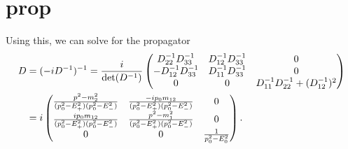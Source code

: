 \documentclass{article}
\begin{document}
\section{prop}
Using this, we can solve for the propagator
\begin{align}
    \notag
    D & = (- iD^{-1})^{-1} 
    = \frac{i}{\det(D^{-1})}
    \begin{pmatrix}
        D^{-1}_{22} D^{-1}_{33}   & D^{-1}_{12}D^{-1}_{33}  & 0 \\
        -D^{-1}_{12}D^{-1}_{33}   & D^{-1}_{11}D^{-1}_{33}  & 0 \\
        0               & 0             & D^{-1}_{11}D^{-1}_{22} + (D^{-1}_{12})^2
    \end{pmatrix} \\
    \label{free pion propagator}
    & 
    = i
    \begin{pmatrix}
        \frac{
            p^2 - m_2^2
        }
        {
            (p_0^2 - E_+^2)(p_0^2 - E_-^2)
        } 
        & \frac{
            - ip_0m_{12}
        }
        {
            (p_0^2 - E_+^2)(p_0^2 - E_-^2)
        } & 0 \\
        \frac{
            ip_0m_{12}
        }
        {
            (p_0^2 - E_+^2)(p_0^2 - E_-^2)
        }
        & \frac{
            p^2 - m_1^2
        }
        {
            (p_0^2 - E_+^2)(p_0^2 - E_-^2)
        } & 0 \\
        0 & 0 & 
        \frac{1}{p_0^2 - E_0^2}
    \end{pmatrix}.
\end{align}
\end{document}
